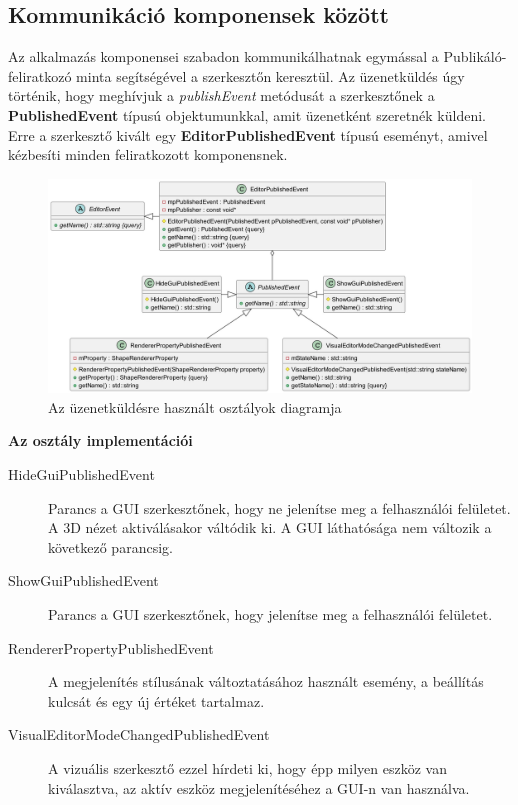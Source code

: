 \subsection{Kommunikáció komponensek között}

Az alkalmazás komponensei szabadon kommunikálhatnak egymással a Publikáló-feliratkozó minta segítségével a szerkesztőn keresztül. Az üzenetküldés úgy történik, hogy meghívjuk a \textit{publishEvent} metódusát a szerkesztőnek a \textbf{PublishedEvent} típusú objektumunkkal, amit üzenetként szeretnék küldeni. Erre a szerkesztő kivált egy \textbf{EditorPublishedEvent} típusú eseményt, amivel kézbesíti minden feliratkozott komponensnek.

\begin{figure}[H]
	\centering
	\includegraphics[width=1\linewidth]{images/class_editor_published_event.png}
	\caption{Az üzenetküldésre használt osztályok diagramja}
	\label{fig:class_editor_published_event-1}
\end{figure}

\textbf{Az osztály implementációi}

\begin{description}
	\item[HideGuiPublishedEvent] Parancs a GUI szerkesztőnek, hogy ne jelenítse meg a felhasználói felületet. A 3D nézet aktiválásakor váltódik ki. A GUI láthatósága nem változik a következő parancsig.
	\item[ShowGuiPublishedEvent] Parancs a GUI szerkesztőnek, hogy jelenítse meg a felhasználói felületet.
	\item[RendererPropertyPublishedEvent] A megjelenítés stílusának változtatásához használt esemény, a beállítás kulcsát és egy új értéket tartalmaz.
	\item[VisualEditorModeChangedPublishedEvent] A vizuális szerkesztő ezzel hírdeti ki, hogy épp milyen eszköz van kiválasztva, az aktív eszköz megjelenítéséhez a GUI-n van használva.
\end{description}

